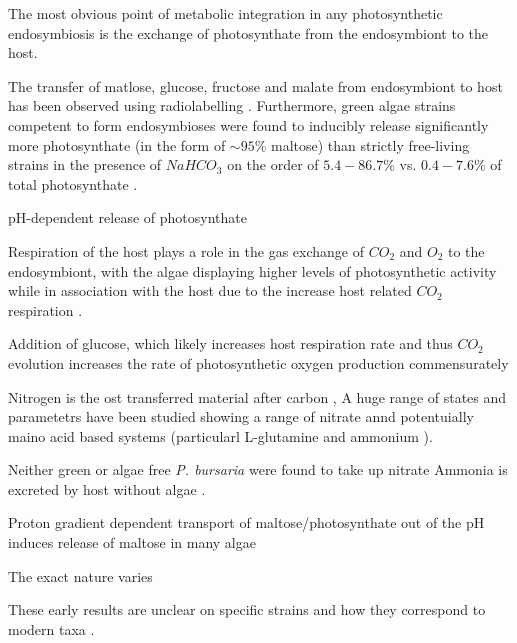  The most obvious point of metabolic integration in any photosynthetic
 endosymbiosis is the exchange
 of photosynthate from the endosymbiont to the host.



The transfer of matlose, glucose, fructose and malate from endosymbiont
to host has been observed using radiolabelling 
\citep{Brown1974}.  Furthermore, green algae strains competent to
 form endosymbioses were found to inducibly release significantly
 more photosynthate (in the form of \(\sim 95\%\) maltose) than strictly free-living strains
 in the presence of \(NaHCO_3\) on the order of \(5.4-86.7\%\) vs. \(0.4-7.6\%\)
 of total photosynthate \citep{Muscatine1967a}.

 pH-dependent release of photosynthate \citep{}



 Respiration of the host plays a role in the gas exchange of \(CO_2\) and \(O_2\) 
 to the endosymbiont, with the algae displaying higher levels of photosynthetic
 activity while in association with the host due to the increase host related 
 \(CO_2\) respiration \citep{Reisser1980}.

Addition of glucose, which likely increases host respiration rate and thus \(CO_2\)
evolution increases the rate of photosynthetic oxygen production commensurately \citep{Reisser1980}






Nitrogen is the ost transferred material after carbon \citep{Kato2009}, 
A huge range of states and parametetrs have been studied showing a range
of nitrate annd potentuially maino acid based systems (particularl L-glutamine and ammonium \citep{Albers1982}).


Neither green or algae free \textit{P. bursaria} were found to take up nitrate 
Ammonia is excreted by host without algae \citep{Albers1982}.


Proton gradient dependent transport of maltose/photosynthate out of the \citep{Schussler1992}
pH induces release of maltose in many algae \citep{}




The exact nature varies 




These early results are unclear on specific strains and how they correspond
to modern taxa \citep{Kato2009}. 









